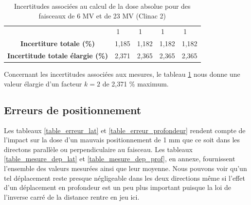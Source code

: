 \documentclass{article}
\begin{document}
\begin{table}[h]
\begin{tabular}{c|cccc|cccc|}
     &
    \multicolumn{1}{c|}{1} &
     &
    1 &
     &
    \multicolumn{1}{c|}{1} &
     &
    1 \\
  \multicolumn{1}{|c|}{\textbf{Incertiture totale (\%)}} &
    \multicolumn{2}{c|}{1,185} &
    \multicolumn{2}{c|}{1,182} &
    \multicolumn{2}{c|}{1,182} &
    \multicolumn{2}{c|}{1,182} \\ \hline
  \multicolumn{1}{|c|}{\textbf{Incertitude totale élargie (\%)}} &
    \multicolumn{2}{c|}{2,371} &
    \multicolumn{2}{c|}{2,365} &
    \multicolumn{2}{c|}{2,365} &
    \multicolumn{2}{c|}{2,365} \\ \hline
  \end{tabular}
  \caption{Incertitudes associées au calcul de la dose absolue pour des faisceaux de 6 MV et de 23 MV (Clinac 2)}
  \label{table_incertitudes_abs}
\end{table}

Concernant les incertitudes associées aux mesures, le tableau \ref*{table_incertitudes_abs} nous donne une valeur élargie d'un facteur $k=2$ de 2,371 \% maximum.

\subsection{Erreurs de positionnement}

Les tableaux \ref*{table_erreur_lat} et \ref*{table_erreur_profondeur} rendent compte de l'impact sur la dose d'un mauvais positionnement de 1 mm que ce soit dans les directons parallèle ou perpendiculaire au faisceau. Les tableaux \ref*{table_mesure_dep_lat} et \ref*{table_mesure_dep_prof}, en annexe, fournissent l'ensemble des valeurs mesurées ainsi que leur moyenne. Nous pouvons voir qu'un tel déplacement reste presque négligeable dans les deux directions même si l'effet d'un déplacement en profondeur est un peu plus important puisque la loi de l'inverse carré de la distance rentre en jeu ici.  
\end{document}
